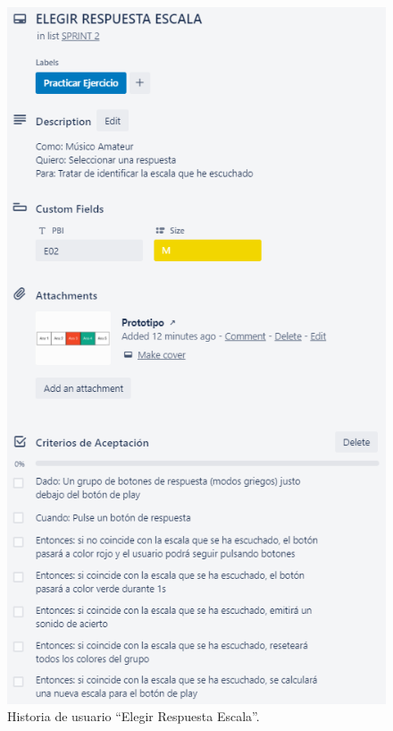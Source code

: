 \documentclass[12pt,twoside,titlepage]{report}
\begin{document}
{\begin{figure}[H]
    \centering
    \includegraphics[scale=1.3]{Scrum/User Stories/EscalasRespuestas}
    \caption{Historia de usuario ``Elegir Respuesta Escala''.}
    \label{fig:EscalasRespuestas}
\end{figure}

}
\end{document}
